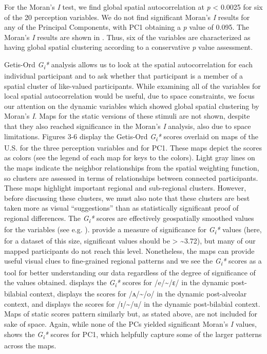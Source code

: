 \documentclass[output=paper]{LSP/langsci}
\begin{document}
For the Moran’s \textit{I }test, we find global spatial autocorrelation at \textit{p }{\textless} 0.0025 for six of the 20 perception variables. We do not find significant Moran’s \textit{I} results for any of the Principal Components, with PC1 obtaining a \textit{p} value of 0.095. The Moran’s \textit{I }results are shown in . Thus, six of the variables are characterized as having global spatial clustering according to a conservative \textit{p} value assessment.

Getis-Ord \textit{G}\textit{\textsubscript{i}}\textit{*} analysis allows us to look at the spatial autocorrelation for each individual participant and to ask whether that participant is a member of a spatial cluster of like-valued participants. While examining all of the variables for local spatial autocorrelation would be useful, due to space constraints, we focus our attention on the dynamic variables which showed global spatial clustering by Moran’s \textit{I}. Maps for the static versions of these stimuli are not shown, despite that they also reached significance in the Moran’s \textit{I} analysis, also due to space limitations. Figures 3-6 display the Getis-Ord \textit{G}\textit{\textsubscript{i}}\textit{* }scores overlaid on maps of the U.S. for the three perception variables and for PC1. These maps depict the scores as colors (see the legend of each map for keys to the colors). Light gray lines on the maps indicate the neighbor relationships from the spatial weighting function, so clusters are assessed in terms of relationships between connected participants. These maps highlight important regional and sub-regional clusters. However, before discussing these clusters, we must also note that these clusters are best taken more as visual “suggestions” than as statistically significant proof of regional differences. The \textit{G}\textit{\textsubscript{i}}\textit{* }scores are effectively geospatially smoothed values for the variables (see e.g. \citealt[37]{grieve_multivariate_2013}). \citet{ord_local_1995} provide a measure of significance for \textit{G}\textit{\textsubscript{i}}\textit{* }values (here, for a dataset of this size, significant values should be {\textgreater} {\textasciitilde}{\textbar}3.72{\textbar}), but many of our mapped participants do not reach this level. Nonetheless, the maps can provide useful visual clues to fine-grained regional patterns and we see the \textit{G}\textit{\textsubscript{i}}\textit{*} scores as a tool for better understanding our data regardless of the degree of significance of the values obtained.  displays the \textit{G}\textit{\textsubscript{i}}\textit{*} scores for /e/{\textasciitilde}/ɛ/ in the dynamic post-bilabial context,  displays the scores for /ʌ/{\textasciitilde}/o/ in the dynamic post-alveolar context, and  displays the scores for /ɪ/{\textasciitilde}/u/ in the dynamic post-bilabial context. Maps of static scores pattern similarly but, as stated above, are not included for sake of space. Again, while none of the PCs yielded significant Moran’s \textit{I} values,  shows the \textit{G}\textit{\textsubscript{i}}\textit{*} scores for PC1, which helpfully capture some of the larger patterns across the maps.
\end{document}
